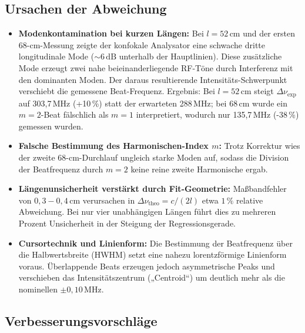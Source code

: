 \subsection*{Ursachen der Abweichung}

\begin{itemize}
  \item \textbf{Modenkontamination bei kurzen Längen:}  
    Bei \(l = 52\,\mathrm{cm}\) und der ersten 68-cm-Messung zeigte der konfokale Analysator eine schwache dritte longitudinale Mode (\(\sim\!6\,\mathrm{dB}\) unterhalb der Hauptlinien). 
    Diese zusätzliche Mode erzeugt zwei nahe beieinanderliegende RF-Töne durch Interferenz mit den dominanten Moden. 
    Der daraus resultierende Intensitäts-Schwerpunkt verschiebt die gemessene Beat-Frequenz. 
    Ergebnis: Bei \(l = 52\,\mathrm{cm}\) steigt \(\Delta\nu_{\mathrm{exp}}\) auf 303{,}7\,MHz (+10\,\%) statt der erwarteten 288\,MHz; bei 68\,cm wurde ein \(m = 2\)-Beat fälschlich als \(m = 1\) interpretiert, wodurch nur 135{,}7\,MHz (-38\,\%) gemessen wurden.

  \item \textbf{Falsche Bestimmung des Harmonischen-Index \(m\):}  
    Trotz Korrektur wies der zweite 68-cm-Durchlauf ungleich starke Moden auf, sodass die Division der Beatfrequenz durch \(m = 2\) keine reine zweite Harmonische ergab.

  \item \textbf{Längenunsicherheit verstärkt durch Fit-Geometrie:}  
    Maßbandfehler von \(0{,}3{-}0{,}4\,\mathrm{cm}\) verursachen in \(\Delta\nu_{\mathrm{theo}} = c/(2l)\) etwa \(1\,\%\) relative Abweichung. 
    Bei nur vier unabhängigen Längen führt dies zu mehreren Prozent Unsicherheit in der Steigung der Regressionsgerade.

  \item \textbf{Cursortechnik und Linienform:}  
    Die Bestimmung der Beatfrequenz über die Halbwertsbreite (HWHM) setzt eine nahezu lorentzförmige Linienform voraus. 
    Überlappende Beats erzeugen jedoch asymmetrische Peaks und verschieben das Intensitätszentrum („Centroid“) um deutlich mehr als die nominellen \(\pm 0{,}10\,\mathrm{MHz}\).
\end{itemize}

\subsection*{Verbesserungsvorschläge}

